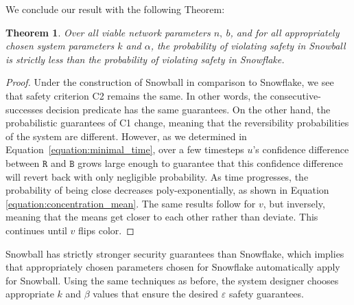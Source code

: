 \documentclass[letterpaper,twocolumn,10pt]{article}
\newcommand{\tronly}[2]{#1}
\newtheorem{theorem}{Theorem}
\theoremstyle{definition}
\begin{document}
\begin{appendices}
\tronly{}{The details are provided in an accompanying technical report~\cite{avalanche}. The central result is as follows:}
We conclude our result with the following Theorem:
\begin{theorem}
Over all viable network parameters $n,\ b$, and for all appropriately chosen system parameters $k$ and $\alpha$, the probability of violating safety in Snowball is strictly less than the probability of violating safety in Snowflake.
\end{theorem}
\begin{proof}
Under the construction of Snowball in comparison to Snowflake, we see that safety criterion C2 remains the same. In other words, the consecutive-successes decision predicate has the same guarantees. 
On the other hand, the probabilistic guarantees of C1 change, meaning that the reversibility probabilities of the system are different. 
However, as we determined in Equation~\ref{equation:minimal_time}, over a few timesteps
$u$'s confidence difference between $\mathtt{R}$ and $\mathtt{B}$ grows large enough to guarantee that this confidence difference will revert back with only negligible probability.
As time progresses, the probability of being close decreases poly-exponentially, as shown in Equation \ref{equation:concentration_mean}. The same results follow for $v$, but inversely, meaning that the means get closer to each other rather than deviate. This continues until $v$ flips color. 
\end{proof}

\tronly{Snowball has strictly stronger security guarantees than Snowflake, which implies that appropriately chosen parameters chosen for Snowflake automatically apply for Snowball. Using the same techniques as before, the system designer chooses appropriate $k$ and $\beta$ values that ensure the desired $\varepsilon$ safety guarantees.}{}

% 


\end{appendices}
\end{document}
